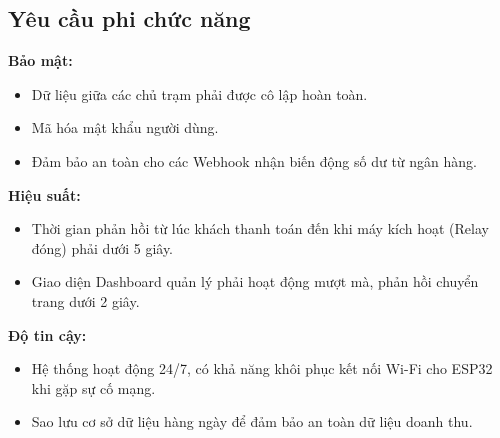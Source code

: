 \documentclass[../main.tex]{subfiles}
\begin{document}
\subsection{Yêu cầu phi chức năng}

\textbf{Bảo mật:}
\begin{itemize}
    \item Dữ liệu giữa các chủ trạm phải được cô lập hoàn toàn.
    \item Mã hóa mật khẩu người dùng.
    \item Đảm bảo an toàn cho các Webhook nhận biến động số dư từ ngân hàng.
\end{itemize}

\textbf{Hiệu suất:}
\begin{itemize}
    \item Thời gian phản hồi từ lúc khách thanh toán đến khi máy kích hoạt (Relay đóng) phải dưới 5 giây.
    \item Giao diện Dashboard quản lý phải hoạt động mượt mà, phản hồi chuyển trang dưới 2 giây.
\end{itemize}

\textbf{Độ tin cậy:}
\begin{itemize}
    \item Hệ thống hoạt động 24/7, có khả năng khôi phục kết nối Wi-Fi cho ESP32 khi gặp sự cố mạng.
    \item Sao lưu cơ sở dữ liệu hàng ngày để đảm bảo an toàn dữ liệu doanh thu.
\end{itemize}
\end{document}
